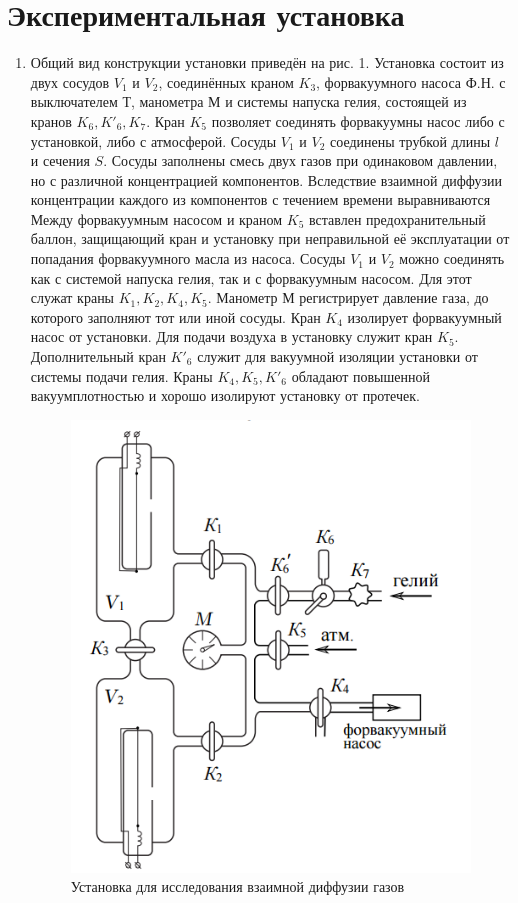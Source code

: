 \documentclass{article}
\begin{document}
\section{Экспериментальная установка}

\begin{enumerate}
\item Общий вид конструкции установки приведён на рис. 1. Установка состоит из двух сосудов $V_1$ и $V_2$, соединённых краном $K_3$, форвакуумного насоса Ф.Н. с выключателем Т, манометра М и системы напуска гелия, состоящей из кранов $K_6, K'_6, K_7$. Кран $K_5$ позволяет соединять форвакуумны насос либо с установкой, либо с атмосферой. Сосуды $V_1$ и $V_2$ соединены трубкой длины $l$ и сечения $S$. Сосуды заполнены смесь двух газов при одинаковом давлении, но с различной концентрацией компонентов. Вследствие взаимной диффузии концентрации каждого из компонентов с течением времени выравниваются Между форвакуумным насосом и краном $K_5$ вставлен предохранительный баллон, защищающий кран и установку при неправильной её эксплуатации от попадания форвакуумного масла из насоса. Сосуды $V_1$ и $V_2$ можно соединять как с системой напуска гелия, так и с форвакуумным насосом. Для этот служат краны $K_1, K_2, K_4, K_5$. Манометр М регистрирует давление газа, до которого заполняют тот или иной сосуды. Кран $K_4$ изолирует форвакуумный насос от установки. Для подачи воздуха в установку служит кран $K_5$. Дополнительный кран $K'_6$ служит для вакуумной изоляции установки от системы подачи гелия. Краны $K_4, K_5, K'_6$ обладают повышенной вакуумплотностью и хорошо изолируют установку от протечек.

\begin{figure}[h]
    \centering
    \includegraphics[width=7.5 cm]{facility.PNG}
    \caption{Установка для исследования взаимной диффузии газов}
    \label{fig:vac}
\end{figure}


\end{enumerate}
\end{document}
